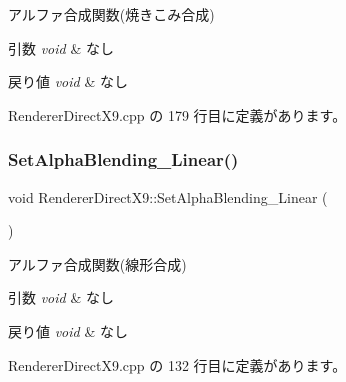 アルファ合成関数(焼きこみ合成) 


\begin{DoxyParams}{引数}
{\em void} & なし \\
\hline
\end{DoxyParams}

\begin{DoxyRetVals}{戻り値}
{\em void} & なし \\
\hline
\end{DoxyRetVals}


 Renderer\+Direct\+X9.\+cpp の 179 行目に定義があります。

\mbox{\label{class_renderer_direct_x9_abfb5264cbb0bf3bacc7b4ec416ddc05a}} 
\subsubsection{\texorpdfstring{Set\+Alpha\+Blending\+\_\+\+Linear()}{SetAlphaBlending\_Linear()}}
{\footnotesize\ttfamily void Renderer\+Direct\+X9\+::\+Set\+Alpha\+Blending\+\_\+\+Linear (\begin{DoxyParamCaption}{ }\end{DoxyParamCaption})}



アルファ合成関数(線形合成) 


\begin{DoxyParams}{引数}
{\em void} & なし \\
\hline
\end{DoxyParams}

\begin{DoxyRetVals}{戻り値}
{\em void} & なし \\
\hline
\end{DoxyRetVals}


 Renderer\+Direct\+X9.\+cpp の 132 行目に定義があります。

\mbox{\label{class_renderer_direct_x9_a75dbeaa680610e655c6ff202591f50d7}} 
